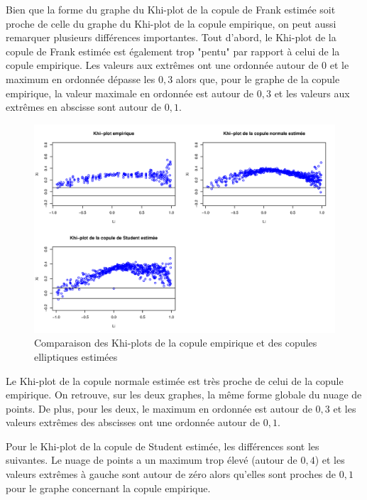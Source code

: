 Bien que la forme du graphe du Khi-plot de la copule de Frank estimée soit proche de celle du graphe du Khi-plot de la copule empirique, on peut aussi remarquer plusieurs différences importantes. Tout d'abord, le Khi-plot de la copule de Frank estimée est également trop "pentu" par rapport à celui de la copule empirique. Les valeurs aux extrêmes ont une ordonnée autour de $0$ et le maximum en ordonnée dépasse les $0,3$ alors que, pour le graphe de la copule empirique, la valeur maximale en ordonnée est autour de $0,3$ et les valeurs aux extrêmes en abscisse sont autour de $0,1$.

\noindent%
\begin{figure}[H]
    \begin{center}
      \includegraphics[width=17 cm, angle=0]{./pictures/ellipcmlkhiplot.png}
      \centering\caption{\label{2}Comparaison des Khi-plots de la copule empirique et des copules elliptiques estimées}
    \end{center}
\end{figure}

Le Khi-plot de la copule normale estimée est très proche de celui de la copule empirique. On retrouve, sur les deux graphes, la même forme globale du nuage de points. De plus, pour les deux, le maximum en ordonnée est autour de $0,3$ et les valeurs extrêmes des abscisses ont une ordonnée autour de $0,1$. 

Pour le Khi-plot de la copule de Student estimée, les différences sont les suivantes. Le nuage de points a un maximum trop élevé (autour de $0,4$) et les valeurs extrêmes à gauche sont autour de zéro alors qu'elles sont proches de $0,1$ pour le graphe concernant la copule empirique.

